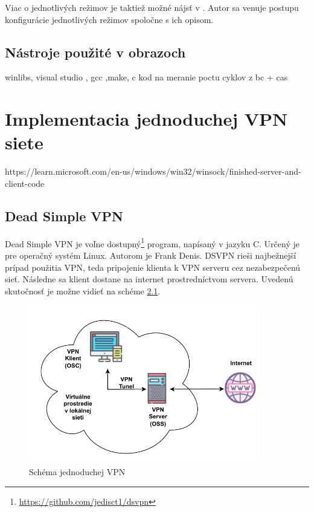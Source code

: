 Viac o jednotlivých režimov je taktiež možné nájsť v \cite{vbguide}. Autor sa venuje postupu konfigurácie jednotlivých režimov spoločne s ich opisom.

\section{Nástroje použité v obrazoch}
  winlibs, visual studio , gcc ,make, c kod na meranie poctu cyklov z bc + cas  
\chapter{Implementacia jednoduchej VPN siete}
https://learn.microsoft.com/en-us/windows/win32/winsock/finished-server-and-client-code
\section{Dead Simple VPN}\label{dsvpn}
Dead Simple VPN je voľne dostupný\footnote{\href{https://github.com/jedisct1/dsvpn}{https://github.com/jedisct1/dsvpn}} program, napísaný v jazyku C. Určený je pre operačný systém Linux. Autorom je Frank Denis. DSVPN rieši najbežnejší prípad použitia VPN, teda pripojenie klienta k VPN serveru cez nezabezpečenú sieť. Následne sa klient dostane na internet prostredníctvom servera. Uvedenú skutočnosť je možne vidieť na schéme \ref{vpnsimple}.
\begin{figure}
	\centering
	\includegraphics[width=0.9\textwidth]{figures/vpnsimple}
	\caption{Schéma jednoduchej VPN}
	\label{vpnsimple}
\end{figure}


